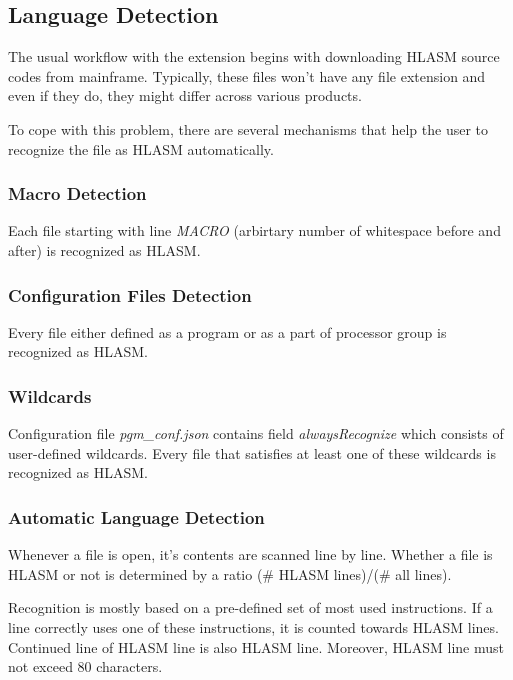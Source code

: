 \subsection{Language Detection}

The usual workflow with the extension begins with downloading HLASM source codes from mainframe. Typically, these files won't have any file extension and even if they do, they might differ across various products.

To cope with this problem, there are several mechanisms that help the user to recognize the file as HLASM automatically.

\subsubsection{Macro Detection}

Each file starting with line \emph{MACRO} (arbirtary number of whitespace before and after) is recognized as HLASM.

\subsubsection{Configuration Files Detection}

Every file either defined as a program or as a part of processor group is recognized as HLASM.

\subsubsection{Wildcards}

Configuration file \emph{pgm\_conf.json} contains field \emph{alwaysRecognize} which consists of user-defined wildcards. Every file that satisfies at least one of these wildcards is recognized as HLASM.

\subsubsection{Automatic Language Detection}

Whenever a file is open, it's contents are scanned line by line. Whether a file is HLASM or not is determined by a ratio (\# HLASM lines)/(\# all lines).

Recognition is mostly based on a pre-defined set of most used instructions. If a line correctly uses one of these instructions, it is counted towards HLASM lines. Continued line of HLASM line is also HLASM line.
Moreover, HLASM line must not exceed 80 characters.

